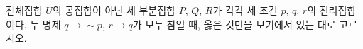 전체집합 $U$의 공집합이 아닌 세 부분집합 $P$, $Q$, $R$가 각각 세 조건 $p$, $q$, $r$의 진리집합이다. 두 명제 $q\longrightarrow\sim p$, $r\longrightarrow q$가 모두 참일 때, 옳은 것만을 보기에서 있는 대로 고르시오. 
